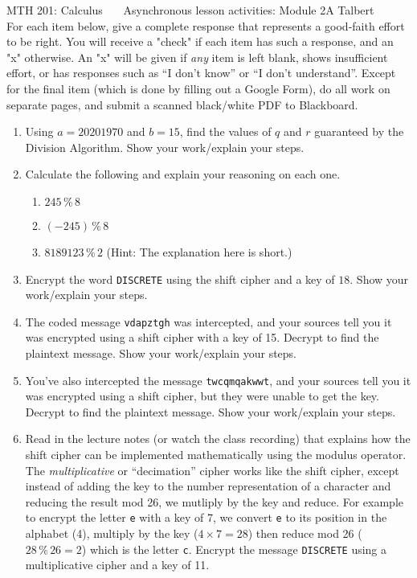 \documentclass[11 pt]{article}
\begin{document}
\noindent MTH 201: Calculus \ \ \ Asynchronous lesson activities: Module 2A \hfill Talbert \\


 For each item below, give a complete response that represents a good-faith effort to be right. You will receive a "check" if each item has such a response, and an "x" otherwise. An "x" will be given if \emph{any} item is left blank, shows insufficient effort, or has responses such as ``I don't know'' or ``I don't understand''. Except for the final item (which is done by filling out a Google Form), do all work on separate pages, and submit a scanned black/white PDF to Blackboard. 

\noindent \hrulefill

\begin{enumerate}

    \item Using $a = 20201970$ and $b = 15$, find the values of $q$ and $r$ guaranteed by the Division Algorithm. Show your work/explain your steps. 

    \item Calculate the following and explain your reasoning on each one. 
    \begin{enumerate}
        \item $245 \, \% \, 8$
        \item $(-245) \, \% \, 8$
        \item $8189123 \, \% \, 2$ (Hint: The explanation here is short.) 
    \end{enumerate}
	
	\item Encrypt the word \texttt{DISCRETE} using the shift cipher and a key of $18$. Show your work/explain your steps. 
	
	\item The coded message \texttt{vdapztgh} was intercepted, and your sources tell you it was encrypted using a shift cipher with a key of 15. Decrypt to find the plaintext message. Show your work/explain your steps. 
	
	\item You've also intercepted the message \texttt{twcqmqakwwt}, and your sources tell you it was encrypted using a shift cipher, but they were unable to get the key. Decrypt to find the plaintext message. Show your work/explain your steps. 
	
	\item Read in the lecture notes (or watch the class recording) that explains how the shift cipher can be implemented mathematically using the modulus operator. The \emph{multiplicative} or ``decimation'' cipher works like the shift cipher, except instead of adding the key to the number representation of a character and reducing the result mod 26, we mutliply by the key and reduce. For example to encrypt the letter \texttt{e} with a key of 7, we convert \texttt{e} to its position in the alphabet (4), multiply by the key ($4 \times 7 = 28$) then reduce mod 26 ($28 \, \% \, 26 = 2$) which is the letter \texttt{c}. Encrypt the message \texttt{DISCRETE} using a multiplicative cipher and a key of 11. 
	

\end{enumerate}
\end{document}
